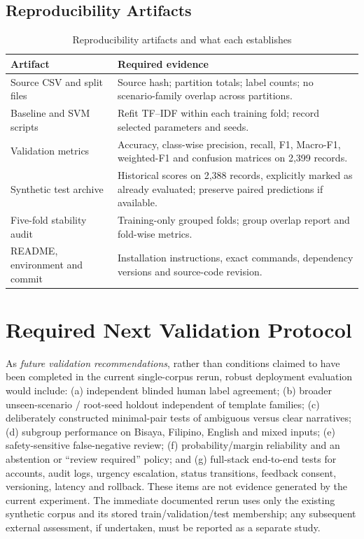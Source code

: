\subsection{Reproducibility Artifacts}
\begin{table}[H]\centering\caption{Reproducibility artifacts and what each establishes}\label{tab:preruncheck}\small
\begin{tabularx}{\textwidth}{p{}X}\toprule
Artifact & Required evidence \\\midrule
Source CSV and split files & Source hash; partition totals; label counts; no scenario-family overlap across partitions. \\
Baseline and SVM scripts & Refit TF--IDF within each training fold; record selected parameters and seeds. \\
Validation metrics & Accuracy, class-wise precision, recall, F1, Macro-F1, weighted-F1 and confusion matrices on 2,399 records. \\
Synthetic test archive & Historical scores on 2,388 records, explicitly marked as already evaluated; preserve paired predictions if available. \\
Five-fold stability audit & Training-only grouped folds; group overlap report and fold-wise metrics. \\
README, environment and commit & Installation instructions, exact commands, dependency versions and source-code revision. \\\bottomrule
\end{tabularx}\end{table}

\section{Required Next Validation Protocol}
As \emph{future validation recommendations}, rather than conditions claimed to have been completed in the current single-corpus rerun, robust deployment evaluation would include: (a) independent blinded human label agreement; (b) broader unseen-scenario / root-seed holdout independent of template families; (c) deliberately constructed minimal-pair tests of ambiguous versus clear narratives; (d) subgroup performance on Bisaya, Filipino, English and mixed inputs; (e) safety-sensitive false-negative review; (f) probability/margin reliability and an abstention or ``review required'' policy; and (g) full-stack end-to-end tests for accounts, audit logs, urgency escalation, status transitions, feedback consent, versioning, latency and rollback. These items are not evidence generated by the current experiment. The immediate documented rerun uses only the existing synthetic corpus and its stored train/validation/test membership; any subsequent external assessment, if undertaken, must be reported as a separate study.

